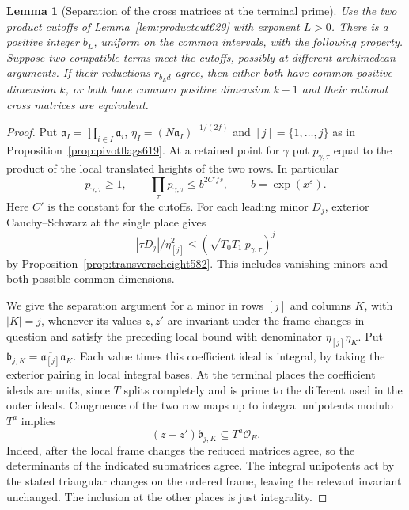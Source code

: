 \documentclass[a4paper,11pt]{article}
\newtheorem{lemma}[proposition]{Lemma}
\theoremstyle{definition}
\theoremstyle{remark}
\numberwithin{equation}{section}
\begin{document}
\begin{lemma}[Separation of the cross matrices at the terminal prime]
\leavevmode\label{lem:terminalpivots640}
Use the two product cutoffs of Lemma~\ref{lem:productcut629}
with exponent \(L>0\). There is a positive integer \(b_L\),
uniform on the common intervals, with the following property.
Suppose two compatible terms meet the cutoffs, possibly at
different archimedean arguments. If their reductions
\(r_{b_L d}\) agree, then either both have common positive
dimension \(k\), or both have common positive dimension \(k-1\)
and their rational cross matrices are equivalent.
\end{lemma}
\begin{proof}
Put \(\mathfrak a_I=\prod_{i\in I}\mathfrak a_i\),
\(\eta_I=(N\mathfrak a_I)^{-1/(2f)}\) and
\([j]=\{1,\ldots,j\}\) as in
Proposition~\ref{prop:pivotflags619}. At a retained point for
\(\gamma\) put \(p_{\gamma,\tau}\) equal to the product of the
local translated heights of the two rows. In particular
\[
        p_{\gamma,\tau}\ge1,\qquad
        \prod_\tau p_{\gamma,\tau}\le b^{2C'fs},
                    \qquad b=\exp(x^\varepsilon).
\]
Here \(C'\) is the constant for the cutoffs. For each leading
minor \(D_j\), exterior Cauchy--Schwarz at the single place gives
\[
        |\tau D_j|/\eta_{[j]}^2\le
                 (\sqrt{T_0T_1}\,p_{\gamma,\tau})^j
\]
by Proposition~\ref{prop:transverseheight582}. This includes
vanishing minors and both possible common dimensions.

We give the separation argument for a minor in rows \([j]\) and
columns \(K\), with \(|K|=j\), whenever its values \(z,z'\)
are invariant under the frame changes in question and satisfy
the preceding local bound with denominator
\(\eta_{[j]}\eta_K\). Put
\(\mathfrak b_{j,K}=\overline{\mathfrak a_{[j]}}\mathfrak a_K\).
Each value times this coefficient ideal is integral, by taking
the exterior pairing in local integral bases. At the terminal
places the coefficient ideals are units, since \(T\) splits
completely and is prime to the different used in the outer
ideals. Congruence of the two row maps up to integral
unipotents modulo \(T^a\) implies
\[
          (z-z')\mathfrak b_{j,K}\subseteq T^a\mathcal O_E .
\]
Indeed, after the local frame changes the reduced matrices
agree, so the determinants of the indicated submatrices agree.
The integral unipotents act by the stated triangular changes
on the ordered frame, leaving the relevant invariant unchanged.
The inclusion at the other places is just integrality.


\end{proof}
\end{document}
